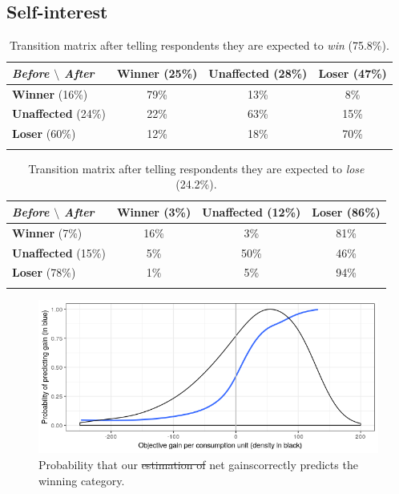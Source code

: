 \documentclass[12pt]{article} %
\providecommand{\DIFaddtex}[1]{{\protect\color{blue}\uwave{#1}}} %
\providecommand{\DIFdeltex}[1]{{\protect\color{red}\sout{#1}}}                      %
\providecommand{\DIFaddFL}[1]{\DIFadd{#1}} %
\providecommand{\DIFdelFL}[1]{\DIFdel{#1}} %
\providecommand{\DIFaddbeginFL}{} %
\providecommand{\DIFaddendFL}{} %
\providecommand{\DIFdelbeginFL}{} %
\providecommand{\DIFdelendFL}{} %
\providecommand{\DIFadd}[1]{\texorpdfstring{\DIFaddtex{#1}}{#1}} %
\providecommand{\DIFdel}[1]{\texorpdfstring{\DIFdeltex{#1}}{}} %
\newcommand{\DIFscaledelfig}{0.5}
\newlength{\DIFdelgraphicswidth} %
\newlength{\DIFdelgraphicsheight} %
\newcommand{\DIFaddincludegraphics}[2][]{{\color{blue}\fbox{\DIFOincludegraphics[#1]{#2}}}} %
\newcommand{\DIFdelincludegraphics}[2][]{%
\sbox{\DIFdelgraphicsbox}{\DIFOincludegraphics[#1]{#2}}%
\settoboxwidth{\DIFdelgraphicswidth}{\DIFdelgraphicsbox} %
\settoboxtotalheight{\DIFdelgraphicsheight}{\DIFdelgraphicsbox} %
\scalebox{\DIFscaledelfig}{%
\parbox[b]{\DIFdelgraphicswidth}{\usebox{\DIFdelgraphicsbox}\\[-\baselineskip] \rule{\DIFdelgraphicswidth}{0em}}\llap{\resizebox{\DIFdelgraphicswidth}{\DIFdelgraphicsheight}{%
\setlength{\unitlength}{\DIFdelgraphicswidth}%
\begin{picture}(1,1)%
\thicklines\linethickness{2pt} %
{\color[rgb]{1,0,0}\put(0,0){\framebox(1,1){}}}%
{\color[rgb]{1,0,0}\put(0,0){\line( 1,1){1}}}%
{\color[rgb]{1,0,0}\put(0,1){\line(1,-1){1}}}%
\end{picture}%
}\hspace*{3pt}}} %
} %
\DeclareRobustCommand{\DIFaddbeginFL}{\DIFOaddbeginFL \let\includegraphics\DIFaddincludegraphics} %
\DeclareRobustCommand{\DIFaddendFL}{\DIFOaddendFL \let\includegraphics\DIFOincludegraphics} %
\DeclareRobustCommand{\DIFdelbeginFL}{\DIFOdelbeginFL \let\includegraphics\DIFdelincludegraphics} %
\DeclareRobustCommand{\DIFdelendFL}{\DIFOaddendFL \let\includegraphics\DIFOincludegraphics} %
\begin{document}
\begin{appendices}
    \subsection{Self-interest \label{subsec:app_perception_si}}

\medskip

\begin{table}[H]
\caption[table]{Transition matrix after telling respondents they are expected to \textit{win} (75.8\%).}
{\label{table:transition_matrix_positive_feedback}}
\centering
\begin{tabular}{lccc}
\textit{Before $\setminus$ After} & \textbf{Winner} (25\%) & \textbf{Unaffected} (28\%) & \textbf{Loser} (47\%) \\
\hline
\textbf{Winner} (16\%) & 79\% & 13\% & 8\%\\
\textbf{Unaffected} (24\%) & 22\% & 63\% & 15\% \\
\textbf{Loser} (60\%) & 12\% & 18\% & 70\% \\ \\
\end{tabular}
\end{table}

\vspace{1cm}

\begin{table}[H]
\caption[table]{Transition matrix after telling respondents they are expected to \textit{lose} (24.2\%).}
{\label{table:transition_matrix_negative_feedback}}
\centering
\begin{tabular}{lccc}
\textit{Before $\setminus$ After} & \textbf{Winner} (3\%) & \textbf{Unaffected} (12\%) & \textbf{Loser} (86\%) \\
\hline
\textbf{Winner} (7\%) & 16\% & 3\% & 81\% \\
\textbf{Unaffected} (15\%) & 5\% & 50\% & 46\% \\
\textbf{Loser} (78\%) & 1\% & 5\% & 94\% \\ \\
\end{tabular}
\end{table}

\vspace{1.5cm}


\begin{figure}[H]
\centering
\includegraphics[width=0.8\columnwidth]{Images/proba_correct_prediction.png}
\caption{Probability that our \DIFdelbeginFL \DIFdelFL{estimation of }\DIFdelendFL net gains\DIFaddbeginFL \DIFaddFL{' estimation }\DIFaddendFL correctly predicts the winning category.}
\label{fig:proba_pred}
\end{figure}


\end{appendices}
\end{document}
